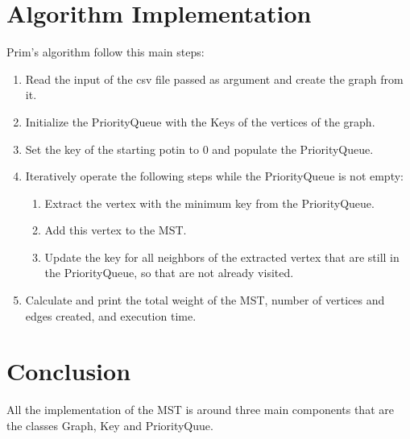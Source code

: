 \section{Algorithm Implementation}
Prim's algorithm follow this main steps:
\begin{enumerate}
  \item Read the input of the csv file passed as argument and create the graph from it.
  \item Initialize the PriorityQueue with the Keys of the vertices of the graph.
  \item Set the key of the starting potin to 0 and populate the PriorityQueue.
  \item Iteratively operate the following steps while the PriorityQueue is not empty:
  \begin{enumerate}
    \item Extract the vertex with the minimum key from the PriorityQueue.
    \item Add this vertex to the MST.
    \item Update the key for all neighbors of the extracted vertex that are still in the PriorityQueue, so that are not already visited.
  \end{enumerate}
  \item Calculate and print the total weight of the MST, number of vertices and edges created, and execution time.
\end{enumerate}

\section{Conclusion}
All the implementation of the MST is around three main components that are the classes Graph, Key and PriorityQuue. 